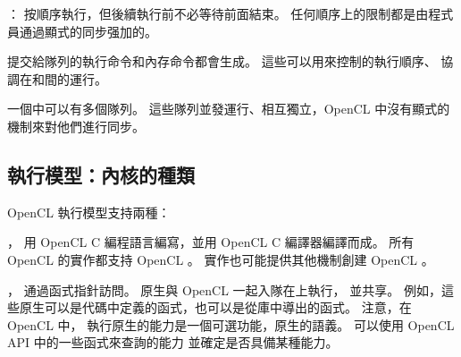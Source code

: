 \item {}：
按順序執行，但後續執行前不必等待前面結束。
任何順序上的限制都是由程式員通過顯式的同步强加的。
\stopigBase

提交給隊列的執行命令和內存命令都會生成。
這些可以用來控制的執行順序、
協調在和間的運行。

一個中可以有多個隊列。
這些隊列並發運行、相互獨立，OpenCL 中沒有顯式的機制來對他們進行同步。

\subsection{執行模型：內核的種類}

OpenCL 執行模型支持兩種：
\startigBase
\item {}，
用 OpenCL C 編程語言編寫，並用 OpenCL C 編譯器編譯而成。
所有 OpenCL 的實作都支持 OpenCL 。
實作也可能提供其他機制創建 OpenCL 。

\item {}，
通過函式指針訪問。
原生與 OpenCL 一起入隊在上執行，
並共享。
例如，這些原生可以是代碼中定義的函式，也可以是從庫中導出的函式。
注意，在 OpenCL 中，
執行原生的能力是一個可選功能，原生的語義。
可以使用 OpenCL API 中的一些函式來查詢的能力
並確定是否具備某種能力。
\stopigBase

